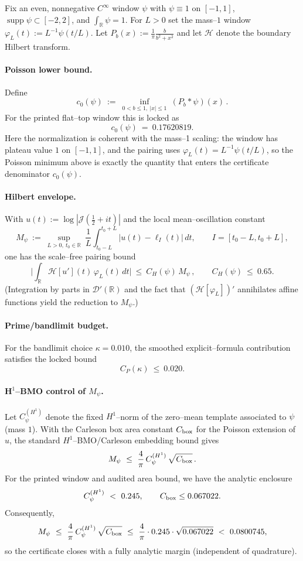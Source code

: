 \documentclass[11pt]{article}
\providecommand{\Mpsilocked}{0.0800745}%
\theoremstyle{definition}
\theoremstyle{remark}
\newcommand{\R}{\mathbb{R}}
\newcommand{\Poisson}{P}
\begin{document}
Fix an even, nonnegative $C^\infty$ window $\psi$ with $\psi\equiv 1$ on $[-1,1]$, $\operatorname{supp}\psi\subset[-2,2]$, and $\int_\R\psi=1$.
For $L>0$ set the mass--$1$ window $\varphi_L(t):=L^{-1}\psi(t/L)$.
Let $\Poisson_b(x):=\frac{1}{\pi}\frac{b}{b^2+x^2}$ and let $\mathcal H$ denote the boundary Hilbert transform.

\paragraph{Poisson lower bound.}
Define
\[
 c_0(\psi)\ :=\ \inf_{0<b\le 1,\ |x|\le 1}\ (\Poisson_{b}*\psi)(x)\,.
\]
For the printed flat--top window this is locked as
\[
 c_0(\psi)\ =\ 0.17620819.
\]
Here the normalization is coherent with the mass--1 scaling: the window has plateau value $1$ on $[-1,1]$, and the pairing uses $\varphi_L(t)=L^{-1}\psi(t/L)$, so the Poisson minimum above is exactly the quantity that enters the certificate denominator $c_0(\psi)$.

\paragraph{Hilbert envelope.}
With $u(t):=\log|\mathcal J(\tfrac12+it)|$ and the local mean--oscillation constant
\[
 M_\psi\ :=\ \sup_{L>0,\ t_0\in\R}\ \frac{1}{L}\int_{t_0-L}^{t_0+L}\big|u(t)-\ell_{I}(t)\big|\,dt,
 \qquad I=[t_0-L,t_0+L],
\]
one has the scale--free pairing bound
\[
 \Big|\int_\R\mathcal H[u'](t)\,\varphi_L(t)\,dt\Big|\ \le\ C_H(\psi)\,M_\psi\,,\qquad C_H(\psi)\ \le\ 0.65.
\]
(Integration by parts in $\mathcal D'(\R)$ and the fact that $(\mathcal H[\varphi_L])'$ annihilates affine functions yield the reduction to $M_\psi$.)

\paragraph{Prime/bandlimit budget.}
For the bandlimit choice $\kappa=0.010$, the smoothed explicit--formula contribution satisfies the locked bound
\[
 C_P(\kappa)\ \le\ 0.020.
\]

\paragraph{H$^1$--BMO control of $M_\psi$.}
Let $C_\psi^{(H^1)}$ denote the fixed $H^1$--norm of the zero--mean template associated to $\psi$ (mass $1$).
With the Carleson box area constant $C_{\rm box}$ for the Poisson extension of $u$, the standard
$H^1$--BMO/Carleson embedding bound gives
\[
 M_\psi\ \le\ \frac{4}{\pi}\,C_\psi^{(H^1)}\,\sqrt{C_{\rm box}}\,.
\]
For the printed window and audited area bound, we have the analytic enclosure
\[
 C_\psi^{(H^1)}\ <\ 0.245,\qquad C_{\rm box}\le 0.067022.
\]
Consequently,
\[
 M_\psi\ \le\ \frac{4}{\pi}\,C_\psi^{(H^1)}\,\sqrt{C_{\rm box}}\ \le\ \frac{4}{\pi}\cdot 0.245\cdot \sqrt{0.067022}\ <\ \Mpsilocked,
\]
so the certificate closes with a fully analytic margin (independent of quadrature).
\end{document}
